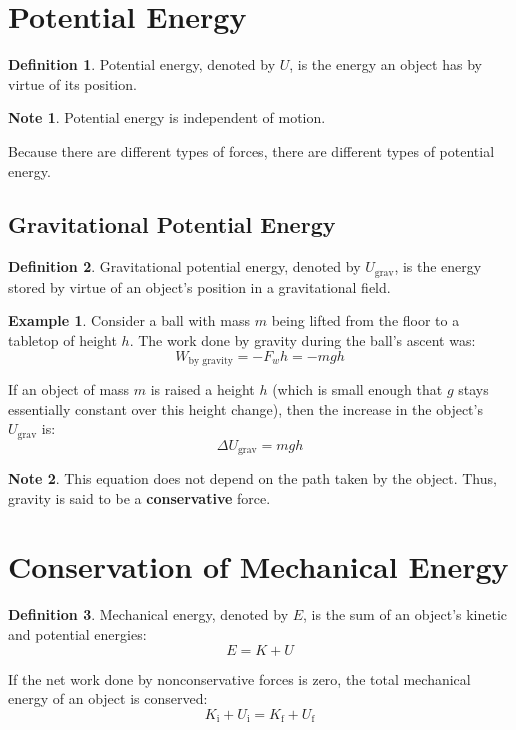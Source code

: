 \documentclass{article}
\theoremstyle{definition}
\theoremstyle{definition}
\newtheorem*{note}{Note}
\theoremstyle{definition}
\theoremstyle{definition}
\newtheorem*{definition}{Definition}
\theoremstyle{definition}
\newtheorem*{example}{Example}
\begin{document}
\section{Potential Energy}
\begin{definition}
    Potential energy, denoted by $U$, is the energy an object has by virtue of its position.
\end{definition}
\begin{note}
    Potential energy is independent of motion.
\end{note}
Because there are different types of forces, there are different types of potential energy.
\subsection{Gravitational Potential Energy}
\begin{definition}
    Gravitational potential energy, denoted by $U_{\text{grav}}$, is the energy stored by virtue of an object's position in a gravitational field.
\end{definition}
\begin{example}
    Consider a ball with mass $m$ being lifted from the floor to a tabletop of height $h$. The work done by gravity during the ball's ascent was:
    \begin{equation*}
        W_{\text{by gravity}} = -F_{w}h = -mgh
    \end{equation*}
\end{example}
If an object of mass $m$ is raised a height $h$ (which is small enough that $g$ stays essentially constant over this height change), then the increase in the object's $U_{\text{grav}}$ is:
\begin{equation*}
    \Delta U_{\text{grav}} = mgh
\end{equation*}
\begin{note}
    This equation does not depend on the path taken by the object. Thus, gravity is said to be a \textbf{conservative} force.
\end{note}

\newpage
\section{Conservation of Mechanical Energy}
\begin{definition}
    Mechanical energy, denoted by $E$, is the sum of an object's kinetic and potential energies:
    \begin{equation*}
        E = K + U
    \end{equation*}
\end{definition}
If the net work done by nonconservative forces is zero, the total mechanical energy of an object is conserved:
\begin{equation*}
    K_{\text{i}} + U_{\text{i}} = K_{\text{f}} + U_{\text{f}}
\end{equation*}
\end{document}

